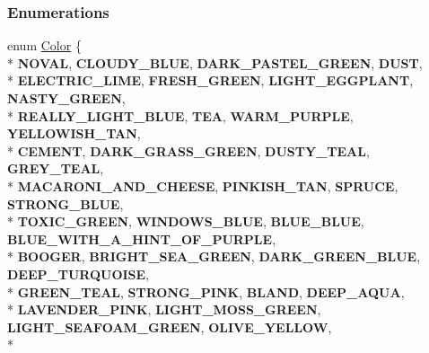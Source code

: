 \subsubsection*{Enumerations}
\begin{DoxyCompactItemize}
\item 
enum \hyperlink{namespaceslb_1_1core_1_1util_afae144e1a65658559242f5cf4fce426f}{Color} \{ \\*
{\bfseries N\+O\+V\+AL}, 
{\bfseries C\+L\+O\+U\+D\+Y\+\_\+\+B\+L\+UE}, 
{\bfseries D\+A\+R\+K\+\_\+\+P\+A\+S\+T\+E\+L\+\_\+\+G\+R\+E\+EN}, 
{\bfseries D\+U\+ST}, 
\\*
{\bfseries E\+L\+E\+C\+T\+R\+I\+C\+\_\+\+L\+I\+ME}, 
{\bfseries F\+R\+E\+S\+H\+\_\+\+G\+R\+E\+EN}, 
{\bfseries L\+I\+G\+H\+T\+\_\+\+E\+G\+G\+P\+L\+A\+NT}, 
{\bfseries N\+A\+S\+T\+Y\+\_\+\+G\+R\+E\+EN}, 
\\*
{\bfseries R\+E\+A\+L\+L\+Y\+\_\+\+L\+I\+G\+H\+T\+\_\+\+B\+L\+UE}, 
{\bfseries T\+EA}, 
{\bfseries W\+A\+R\+M\+\_\+\+P\+U\+R\+P\+LE}, 
{\bfseries Y\+E\+L\+L\+O\+W\+I\+S\+H\+\_\+\+T\+AN}, 
\\*
{\bfseries C\+E\+M\+E\+NT}, 
{\bfseries D\+A\+R\+K\+\_\+\+G\+R\+A\+S\+S\+\_\+\+G\+R\+E\+EN}, 
{\bfseries D\+U\+S\+T\+Y\+\_\+\+T\+E\+AL}, 
{\bfseries G\+R\+E\+Y\+\_\+\+T\+E\+AL}, 
\\*
{\bfseries M\+A\+C\+A\+R\+O\+N\+I\+\_\+\+A\+N\+D\+\_\+\+C\+H\+E\+E\+SE}, 
{\bfseries P\+I\+N\+K\+I\+S\+H\+\_\+\+T\+AN}, 
{\bfseries S\+P\+R\+U\+CE}, 
{\bfseries S\+T\+R\+O\+N\+G\+\_\+\+B\+L\+UE}, 
\\*
{\bfseries T\+O\+X\+I\+C\+\_\+\+G\+R\+E\+EN}, 
{\bfseries W\+I\+N\+D\+O\+W\+S\+\_\+\+B\+L\+UE}, 
{\bfseries B\+L\+U\+E\+\_\+\+B\+L\+UE}, 
{\bfseries B\+L\+U\+E\+\_\+\+W\+I\+T\+H\+\_\+\+A\+\_\+\+H\+I\+N\+T\+\_\+\+O\+F\+\_\+\+P\+U\+R\+P\+LE}, 
\\*
{\bfseries B\+O\+O\+G\+ER}, 
{\bfseries B\+R\+I\+G\+H\+T\+\_\+\+S\+E\+A\+\_\+\+G\+R\+E\+EN}, 
{\bfseries D\+A\+R\+K\+\_\+\+G\+R\+E\+E\+N\+\_\+\+B\+L\+UE}, 
{\bfseries D\+E\+E\+P\+\_\+\+T\+U\+R\+Q\+U\+O\+I\+SE}, 
\\*
{\bfseries G\+R\+E\+E\+N\+\_\+\+T\+E\+AL}, 
{\bfseries S\+T\+R\+O\+N\+G\+\_\+\+P\+I\+NK}, 
{\bfseries B\+L\+A\+ND}, 
{\bfseries D\+E\+E\+P\+\_\+\+A\+Q\+UA}, 
\\*
{\bfseries L\+A\+V\+E\+N\+D\+E\+R\+\_\+\+P\+I\+NK}, 
{\bfseries L\+I\+G\+H\+T\+\_\+\+M\+O\+S\+S\+\_\+\+G\+R\+E\+EN}, 
{\bfseries L\+I\+G\+H\+T\+\_\+\+S\+E\+A\+F\+O\+A\+M\+\_\+\+G\+R\+E\+EN}, 
{\bfseries O\+L\+I\+V\+E\+\_\+\+Y\+E\+L\+L\+OW}, 
\\*

\end{DoxyCompactItemize}
